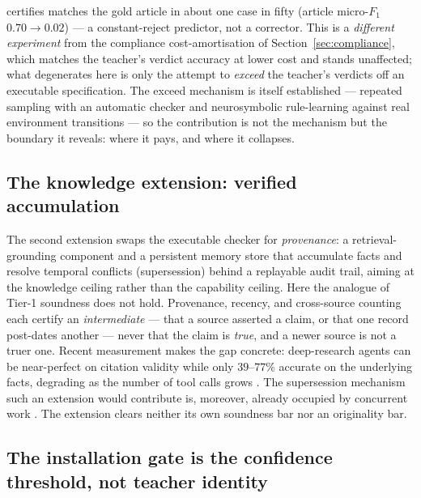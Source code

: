 \documentclass[11pt]{article}
\theoremstyle{plain}
\begin{document}
certifies matches the gold article in about one case in fifty (article
micro-$F_1$ $0.70 \rightarrow 0.02$) --- a constant-reject predictor, not
a corrector. This is a \emph{different experiment} from the compliance
cost-amortisation of Section~\ref{sec:compliance}, which matches the
teacher's verdict accuracy at lower cost and stands unaffected; what
degenerates here is only the attempt to \emph{exceed} the teacher's
verdicts off an executable specification. The exceed mechanism is itself
established --- repeated sampling with an automatic checker
\citep{brown2024monkeys} and neurosymbolic rule-learning against real
environment transitions \citep{zhou2025walle2} --- so the contribution is
not the mechanism but the boundary it reveals: where it pays, and where it
collapses.

\subsection{The knowledge extension: verified accumulation}
The second extension swaps the executable checker for \emph{provenance}: a
retrieval-grounding component and a persistent memory store that
accumulate facts and resolve temporal conflicts (supersession) behind a
replayable audit trail, aiming at the knowledge ceiling rather than the
capability ceiling. Here the analogue of Tier-1 soundness does not hold.
Provenance, recency, and cross-source counting each certify an
\emph{intermediate} --- that a source asserted a claim, or that one record
post-dates another --- never that the claim is \emph{true}, and a newer
source is not a truer one. Recent measurement makes the gap concrete:
deep-research agents can be near-perfect on citation validity while only
$39$--$77\%$ accurate on the underlying facts, degrading as the number of
tool calls grows \citep{onweller2026cited}. The supersession mechanism
such an extension would contribute is, moreover, already occupied by
concurrent work \citep{joshi2026eywa,patel2026supersede}. The extension
clears neither its own soundness bar nor an originality bar.

\subsection{The installation gate is the confidence threshold, not teacher identity}
\label{sec:threshold-gate}
\end{document}
